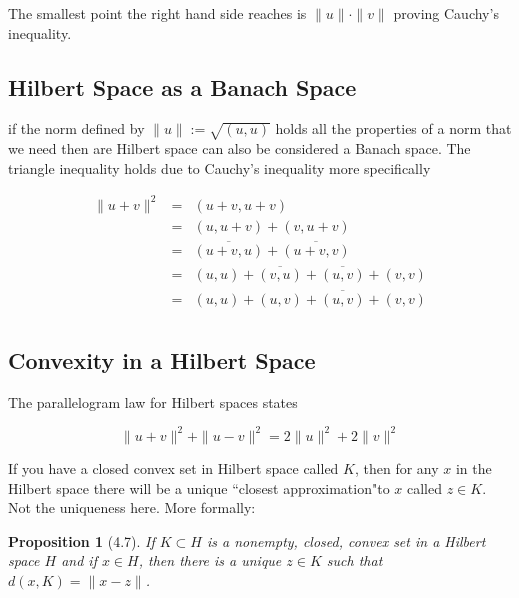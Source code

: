 \documentclass[oneside]{book}
\newtheorem{proposition}[theorem]{Proposition}
\begin{document}
The smallest point the right hand side reaches is $\|u\| \cdot \|v\|$ proving Cauchy's inequality.

\subsection{Hilbert Space as a Banach Space}
if the norm defined by $\|u\| := \sqrt{(u,u)}$ holds all the properties of a norm that we need then are Hilbert space can also be considered a Banach space. The triangle inequality holds due to Cauchy's inequality more specifically

\begin{eqnarray}
\|u+v\|^2 &=& (u+v,u+v)\nonumber\\
&=&(u,u+v)+(v,u+v)\nonumber\\
&=& \overline{(u+v,u)}+\overline{(u+v,v)} \nonumber\\
&=& (u,u)+\overline{(v,u)}+\overline{(u,v)}+(v,v) \nonumber\\
&=& (u,u)+(u,v)+\overline{(u,v)}+(v,v)\nonumber\\
\end{eqnarray}

\subsection{Convexity in a Hilbert Space}

The parallelogram law for Hilbert spaces states

\begin{equation}
\|u+v\|^2 + \|u-v\|^2 = 2\|u\|^2 + 2\|v\|^2
\end{equation}

If you have a closed convex set in Hilbert space called $K$, then for any $x$ in the Hilbert space there will be a unique ``closest approximation"to $x$ called $z \in K$. Not the uniqueness here. More formally:

\begin{proposition}[4.7]
If $K \subset H$ is a nonempty, closed, convex set in a Hilbert space $H$ and if $x \in H$, then there is a unique $z \in K$ such that $d(x,K)=\| x-z\|$.
\end{proposition} 
\end{document}

